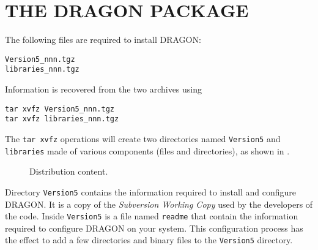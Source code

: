 \section{THE DRAGON PACKAGE}\label{sect:DragonExportPackage}

The following files are required to install DRAGON:

\begin{verbatim}
Version5_nnn.tgz
libraries_nnn.tgz
\end{verbatim}

\vskip 0.08cm

Information is recovered from the two archives using
\begin{verbatim}
tar xvfz Version5_nnn.tgz
tar xvfz libraries_nnn.tgz
\end{verbatim}

\noindent The {\tt tar xvfz} operations will create two directories named {\tt Version5} and {\tt
libraries} made of various components (files and directories), as shown in .

\begin{figure}[h!]  
\begin{center} 
\epsfxsize=10cm \centerline{ }
\parbox{16cm}{\caption{Distribution content.}\label{fig:tree2}}    
\end{center}  
\end{figure}

Directory {\tt Version5} contains the information required to install and configure
DRAGON. It is a copy of the {\sl Subversion Working Copy} used by the developers of the
code. Inside {\tt Version5} is a file named {\tt readme} that contain the
information required to configure DRAGON on your system. This configuration
process has the effect to add a few directories and binary files to the
{\tt Version5} directory.

\vskip 0.08cm

